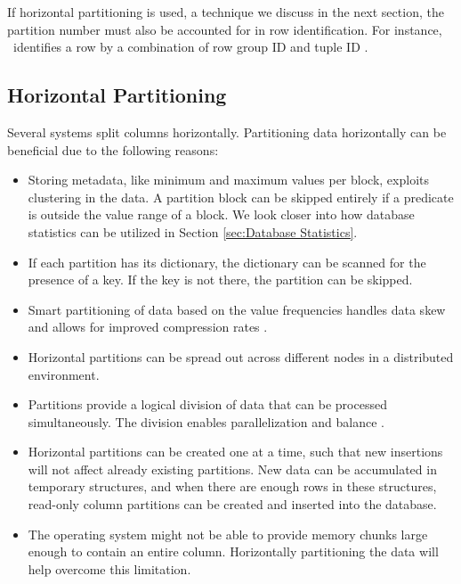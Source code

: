 If horizontal partitioning is used, a technique we discuss in the next section, the partition number must also be accounted for in row identification. For instance, \mssql~identifies a row by a combination of row group ID and tuple ID \cite{Larson2013-mc}.

\subsection{Horizontal Partitioning}
\label{sub:Horizontal Partitioning}
Several systems split columns horizontally. Partitioning data horizontally can be beneficial due to the following reasons:
\begin{itemize}
  \item Storing metadata, like minimum and maximum values per block, exploits clustering in the data. A partition block can be skipped entirely if a predicate is outside the value range of a block. We look closer into how database statistics can be utilized in Section \ref{sec:Database Statistics}. 
  \item If each partition has its dictionary, the dictionary can be scanned for the presence of a key. If the key is not there, the partition can be skipped.
  \item Smart partitioning of data based on the value frequencies handles data skew and allows for improved compression rates \cite{Raman2008-gi}. 
  \item Horizontal partitions can be spread out across different nodes in a distributed environment. 
  \item Partitions provide a logical division of data that can be processed simultaneously. The division enables parallelization and balance \cite{Exasol2014-xh}.
  \item Horizontal partitions can be created one at a time, such that new insertions will not affect already existing partitions. New data can be accumulated in temporary structures, and when there are enough rows in these structures, read-only column partitions can be created and inserted into the database.
  \item The operating system might not be able to provide memory chunks large enough to contain an entire column. Horizontally partitioning the data will help overcome this limitation.
\end{itemize}


